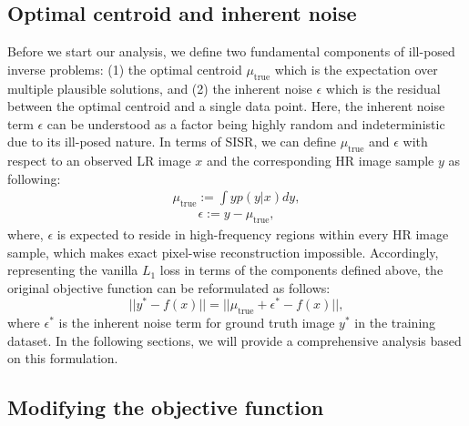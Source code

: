 \documentclass[letterpaper]{article} %
\begin{document}
\subsection{Optimal centroid and inherent noise}
Before we start our analysis, we define two fundamental components of ill-posed inverse problems: (1) the optimal centroid $\mu_{\text{true}}$ which is the expectation over multiple plausible solutions, and (2) the inherent noise $\epsilon$ which is the residual between the optimal centroid and a single data point. Here, the inherent noise term $\epsilon$ can be understood as a factor being highly random and indeterministic due to its ill-posed nature. In terms of SISR, we can define $\mu_{\text{true}}$ and $\epsilon$ with respect to an observed LR image $x$ and the corresponding HR image sample $y$ as following:
%
%
\begin{equation}
    \begin{aligned}
    \mu_\text{true} := \int yp(y|x) dy
    ,
    \end{aligned}
\end{equation}
\begin{equation}
        \begin{aligned}
        \epsilon := y - \mu_\text{true}
        ,
        \end{aligned}
\end{equation}
% 
where, $\epsilon$ is expected to reside in high-frequency regions within every HR image sample, which makes exact pixel-wise reconstruction impossible.
%
Accordingly, representing the vanilla $L_1$ loss in terms of the components defined above, the original objective function can be reformulated as follows:
\begin{equation}
    \label{eq:original_loss}
    ||y^* - f(x)|| = ||\mu_{\text{true}} + \epsilon^* - f(x) ||,
\end{equation}
where $\epsilon^*$ is the inherent noise term for ground truth image $y^*$ in the training dataset. 
In the following sections, we will provide a comprehensive analysis based on this formulation.





\subsection{Modifying the objective function}
\end{document}
